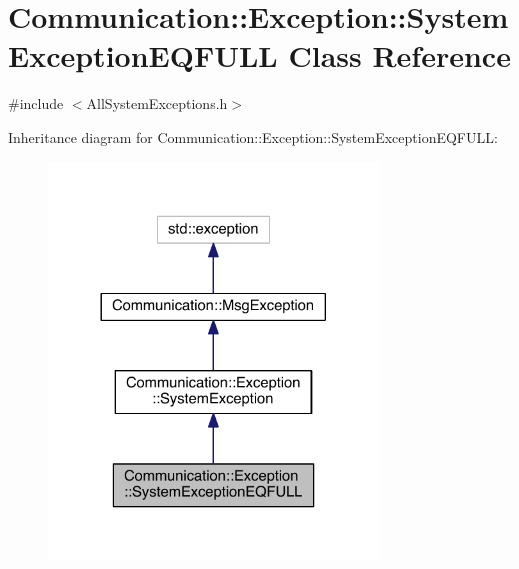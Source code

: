 \hypertarget{class_communication_1_1_exception_1_1_system_exception_e_q_f_u_l_l}{}\section{Communication\+:\+:Exception\+:\+:System\+Exception\+E\+Q\+F\+U\+L\+L Class Reference}
\label{class_communication_1_1_exception_1_1_system_exception_e_q_f_u_l_l}


{\ttfamily \#include $<$All\+System\+Exceptions.\+h$>$}



Inheritance diagram for Communication\+:\+:Exception\+:\+:System\+Exception\+E\+Q\+F\+U\+L\+L\+:\nopagebreak
\begin{figure}[H]
\begin{center}
\leavevmode
\includegraphics[width=248pt]{class_communication_1_1_exception_1_1_system_exception_e_q_f_u_l_l__inherit__graph}
\end{center}
\end{figure}


